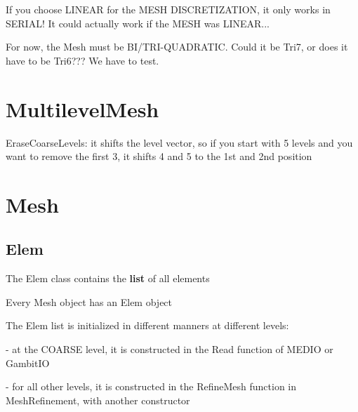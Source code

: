 \documentclass[10pt]{book}
\begin{document}
    
 If you choose LINEAR for the MESH DISCRETIZATION, it only works in SERIAL! It could actually work if the MESH was LINEAR...
 
 For now, the Mesh must be BI/TRI-QUADRATIC. Could it be Tri7, or does it have to be Tri6??? We have to test.
 
 
   
     \section{MultilevelMesh}
   
  EraseCoarseLevels: it shifts the level vector, 
   so if you start with 5 levels and you want to remove the first 3,
   it shifts 4 and 5 to the 1st and 2nd position 
   
   \section{Mesh}
   
  
   \subsection{Elem}
  
  The Elem class contains the \textbf{list} of all elements
  
  Every Mesh object has an Elem object
  
  The Elem list is initialized in different manners at different levels:
  
  - at the COARSE level, it is constructed in the Read function of MEDIO or GambitIO
  
  - for all other levels, it is constructed in the RefineMesh function in MeshRefinement, with another constructor
  
  
  
  
  
\end{document}
